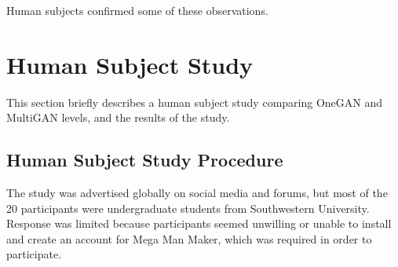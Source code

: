 
Human subjects confirmed some of these observations.

\section{Human Subject Study}

This section briefly describes a human subject study comparing OneGAN and MultiGAN levels, and the results of the study.

\subsection{Human Subject Study Procedure}

The study was advertised globally on social media and forums, but most of the 20 participants were undergraduate students from Southwestern University.
Response was limited because participants seemed unwilling or unable to install and create an account for Mega Man Maker, which was required in order to participate.


